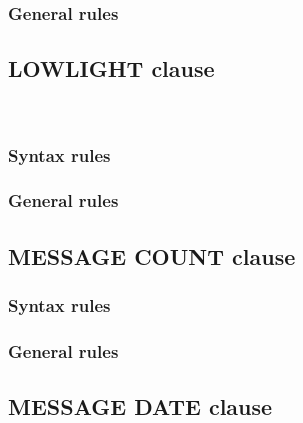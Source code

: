 \subsubsection{General rules}

\subsection{LOWLIGHT clause}

\begin{syntax}
  \begin{1=}
     \\
  \end{1=}
\end{syntax}

\subsubsection{Syntax rules}

\subsubsection{General rules}

\subsection{MESSAGE COUNT clause}

\begin{syntax}[\deletedcolour]
\end{syntax}

\subsubsection{Syntax rules}

\subsubsection{General rules}

\subsection{MESSAGE DATE clause}

\begin{syntax}[\deletedcolour]
\end{syntax}


